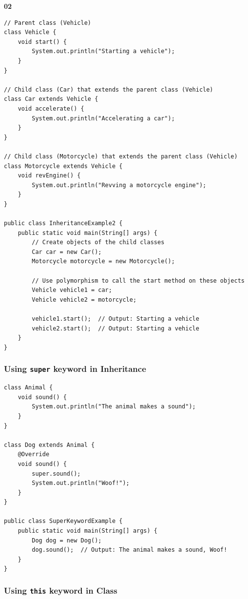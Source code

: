 \documentclass{book}
\begin{document}
\textbf{02}

\begin{verbatim}
// Parent class (Vehicle)
class Vehicle {
    void start() {
        System.out.println("Starting a vehicle");
    }
}

// Child class (Car) that extends the parent class (Vehicle)
class Car extends Vehicle {
    void accelerate() {
        System.out.println("Accelerating a car");
    }
}

// Child class (Motorcycle) that extends the parent class (Vehicle)
class Motorcycle extends Vehicle {
    void revEngine() {
        System.out.println("Revving a motorcycle engine");
    }
}

public class InheritanceExample2 {
    public static void main(String[] args) {
        // Create objects of the child classes
        Car car = new Car();
        Motorcycle motorcycle = new Motorcycle();

        // Use polymorphism to call the start method on these objects
        Vehicle vehicle1 = car;
        Vehicle vehicle2 = motorcycle;

        vehicle1.start();  // Output: Starting a vehicle
        vehicle2.start();  // Output: Starting a vehicle
    }
}
\end{verbatim}


\subsubsection{Using \texttt{super} keyword in Inheritance}

\begin{verbatim}
class Animal {
    void sound() {
        System.out.println("The animal makes a sound");
    }
}

class Dog extends Animal {
    @Override
    void sound() {
        super.sound();
        System.out.println("Woof!");
    }
}

public class SuperKeywordExample {
    public static void main(String[] args) {
        Dog dog = new Dog();
        dog.sound();  // Output: The animal makes a sound, Woof!
    }
}
\end{verbatim}


\subsubsection{Using \texttt{this} keyword in Class}
\end{document}
